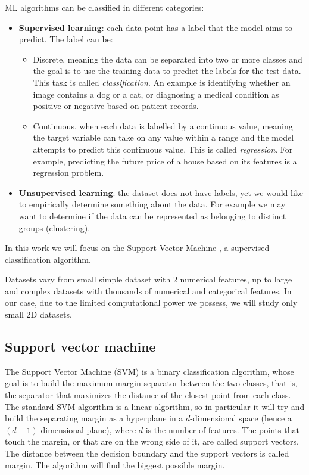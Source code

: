 \documentclass[12pt]{article}
\begin{document}
ML algorithms can be classified in different categories: 
\begin{itemize}
    \item \textbf{Supervised learning}: each data point has a label that the model aims to predict. The label can be:
    \begin{itemize}
        \item Discrete, meaning the data can be separated into two or more classes and the goal is to use the training data to predict the labels for the test data. This task is called \textit{classification}. An example is identifying whether an image contains a dog or a cat, or diagnosing a medical condition as positive or negative based on patient records.
        \item Continuous, when each data is labelled by a continuous value, meaning the target variable can take on any value within a range and the model attempts to predict this continuous value. This is called \textit{regression}. For example, predicting the future price of a house based on its features is a regression problem.
    \end{itemize}
    \item \textbf{Unsupervised learning}: the dataset does not have labels, yet we would like to empirically determine something about the data. For example we may want to determine if the data can be represented as belonging to distinct groups (clustering).
\end{itemize}

In this work we will focus on the Support Vector Machine \cite{cristianini2000}, a supervised classification algorithm. 

Datasets vary from small simple dataset with 2 numerical features, up to large and complex datasets with thousands of numerical and categorical features. In our case, due to the limited computational power we possess, we will study only small 2D datasets.




\subsection{Support vector machine}

The Support Vector Machine (SVM) \cite{cristianini2000} is a binary classification algorithm, whose goal is to build the maximum margin separator between the two classes, that is, the separator that maximizes the distance of the closest point from each class. The standard SVM algorithm is a linear algorithm, so in particular it will try and build the separating margin as a hyperplane in a $d$-dimensional space (hence a $(d-1)$-dimensional plane), where $d$ is the number of features. The points that touch the margin, or that are on the wrong side of it, are called support vectors. The distance between the decision boundary and the support vectors is called margin. The algorithm will find the biggest possible margin. 
\end{document}
